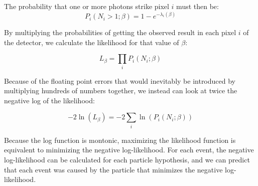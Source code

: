  The probability that one or more photons strike pixel $i$ must then be:
\begin{equation}
P_i(N_i>1; \beta) = 1 - e^{-\lambda_i(\beta)}
\end{equation}

By multiplying the probabilities of getting the observed result in each pixel $i$ of the detector, we calculate the likelihood for that value of $\beta$:

\begin{equation}
L_\beta = \prod_{i}P_i(N_i; \beta)
\end{equation}

Because of the floating point errors that would inevitably be introduced by multiplying hundreds of numbers together, we instead can look at twice the negative log of the likelihood:

\begin{equation}
    \label{eq:log-likelihood}
    -2\ln(L_\beta) = -2\sum_i \ln(P_i(N_i; \beta))
\end{equation}

Because the log function is montonic, maximizing the likelihood function is equivalent to minimizing the negative log-likelihood.
For each event, the negative log-likelihood can be calculated for each particle hypothesis, and we can predict that each event was caused by the particle that minimizes the negative log-likelihood.



\endinput

Any text after an \endinput is ignored.
You could put scraps here or things in progress.
